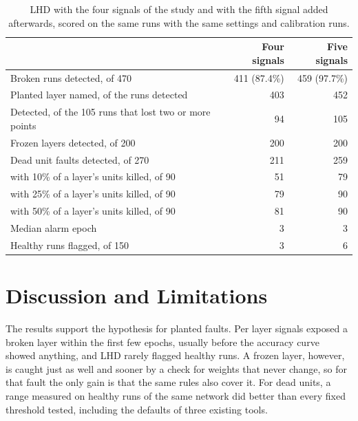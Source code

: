 \documentclass[11pt]{article}
\begin{document}
\begin{table}[t]
\centering
\small
\caption{LHD with the four signals of the study and with the fifth signal added afterwards, scored on the same runs with the same settings and calibration runs.}
\label{tab:v2}
\begin{tabular}{@{}lrr@{}}
\toprule
 & Four signals & Five signals \\
\midrule
Broken runs detected, of 470 & 411 (87.4\%) & 459 (97.7\%) \\
Planted layer named, of the runs detected & 403 & 452 \\
Detected, of the 105 runs that lost two or more points & 94 & 105 \\
Frozen layers detected, of 200 & 200 & 200 \\
Dead unit faults detected, of 270 & 211 & 259 \\
\quad with 10\% of a layer's units killed, of 90 & 51 & 79 \\
\quad with 25\% of a layer's units killed, of 90 & 79 & 90 \\
\quad with 50\% of a layer's units killed, of 90 & 81 & 90 \\
Median alarm epoch & 3 & 3 \\
\midrule
Healthy runs flagged, of 150 & 3 & 6 \\
\bottomrule
\end{tabular}
\end{table}


\section{Discussion and Limitations}

The results support the hypothesis for planted faults. Per layer signals exposed a broken layer within the first few epochs, usually before the accuracy curve showed anything, and LHD rarely flagged healthy runs. A frozen layer, however, is caught just as well and sooner by a check for weights that never change, so for that fault the only gain is that the same rules also cover it. For dead units, a range measured on healthy runs of the same network did better than every fixed threshold tested, including the defaults of three existing tools.
\end{document}

